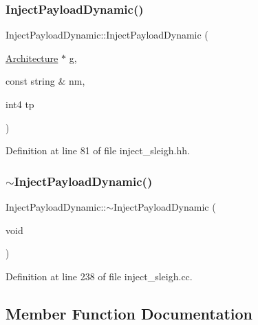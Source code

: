 \subsubsection{\texorpdfstring{InjectPayloadDynamic()}{InjectPayloadDynamic()}}
{\footnotesize\ttfamily Inject\+Payload\+Dynamic\+::\+Inject\+Payload\+Dynamic (\begin{DoxyParamCaption}\item[{\mbox{\hyperlink{class_architecture}{Architecture}} $\ast$}]{g,  }\item[{const string \&}]{nm,  }\item[{int4}]{tp }\end{DoxyParamCaption})\hspace{0.3cm}{\ttfamily [inline]}}



Definition at line 81 of file inject\+\_\+sleigh.\+hh.

\mbox{\label{class_inject_payload_dynamic_ad5024c88c8278aef91d19718ffb6804b}} 
\subsubsection{\texorpdfstring{$\sim$InjectPayloadDynamic()}{~InjectPayloadDynamic()}}
{\footnotesize\ttfamily Inject\+Payload\+Dynamic\+::$\sim$\+Inject\+Payload\+Dynamic (\begin{DoxyParamCaption}\item[{void}]{ }\end{DoxyParamCaption})\hspace{0.3cm}{\ttfamily [virtual]}}



Definition at line 238 of file inject\+\_\+sleigh.\+cc.



\subsection{Member Function Documentation}
\mbox{\label{class_inject_payload_dynamic_a8c3b9e0779ebc8369ad309d2299b46b6}} 
